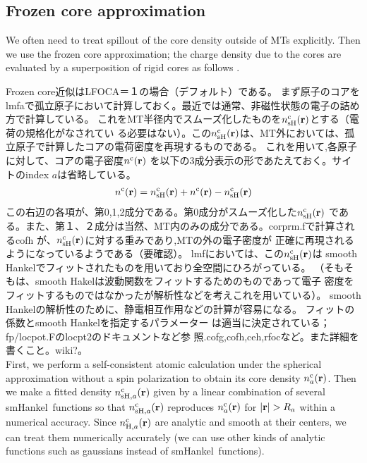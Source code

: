 \documentclass[twocolumn,showpacs,preprintnumbers,amsmath,amssymb,floatfix]{revtex4-1}
\newcommand{\bfr}{{\bf r}}
\def\smh{smHankel}
\def\nc{n^{\rm c}}
\def\smh{smHankel}
\def\nc{n^{\rm c}}
\begin{document}
\begin{widetext}
\subsection{Frozen core approximation}
\label{sec:frozencore} We often need to treat spillout of the core
density outside of MTs explicitly. Then we use the frozen core
approximation; the charge density due to the cores are evaluated by a
superposition of rigid cores as follows \cite{lmfchap}.

Frozen core近似はLFOCA＝１の場合（デフォルト）である。
まず原子のコアをlmfaで孤立原子において計算しておく。最近では通常、非磁性状態の電子の詰め方で計算している。
これをMT半径内でスムーズ化したものを$n^{\rm c}_{\rm sH}(\bfr)$とする（電荷の規格化がなされてい
る必要はない）。この$n^{\rm c}_{\rm sH}(\bfr)$は、MT外においては、孤
立原子で計算したコアの電荷密度を再現するものである。
これを用いて,各原子に対して、コアの電子密度$n^{\rm c}(\bfr)$
を以下の3成分表示の形であたえておく。サイトのindex $a$は省略している。
\begin{eqnarray}
n^{\rm c}(\bfr)= 
n^{\rm c}_{\rm sH}(\bfr)
+ n^{\rm c}(\bfr)- n^{\rm c}_{\rm sH}(\bfr)
\label{eq:nc}
\end{eqnarray}
この右辺の各項が、第0,1,2成分である。第0成分がスムーズ化した$n^{\rm c}_{\rm sH}(\bfr)$
である。また、第１、２成分は当然、MT内のみの成分である。corprm.fで計算されるcofh
が、$n^{\rm c}_{\rm sH}(\bfr)$に対する重みであり,MTの外の電子密度が
正確に再現されるようになっているようである（要確認）。
lmfにおいては、この$n^{\rm c}_{\rm sH}(\bfr)$は
smooth Hankelでフィットされたものを用いており全空間にひろがっている。
（そもそもは、smooth Hakelは波動関数をフィットするためのものであって電子
密度をフィットするものではなかったが解析性などを考えこれを用いている）。
smooth Hankelの解析性のために、静電相互作用などの計算が容易になる。
フィットの係数とsmooth Hankelを指定するパラメーター
は適当に決定されている；fp/locpot.Fのlocpt2のドキュメントなど参
照.cofg,cofh,ceh,rfocなど。また詳細を書くこと。wiki?。\\
First, we perform a self-consistent atomic calculation under the
spherical approximation without a spin polarization to obtain its core
density $\nc_a(\bfr)$. Then we make a fitted density $\nc_{{\rm
sH},a}(\bfr)$ given by a linear combination of several \smh\ functions
so that $\nc_{{\rm sH},a}(\bfr)$ reproduces $\nc_{a}(\bfr)$ for
$|\bfr|>R_a$ within a numerical accuracy. Since $\nc_{{\rm H},a}(\bfr)$
are analytic and smooth at their centers, we can treat them numerically
accurately (we can use other kinds of analytic functions such as
gaussians instead of \smh\ functions).
  

\end{widetext}
\end{document}
